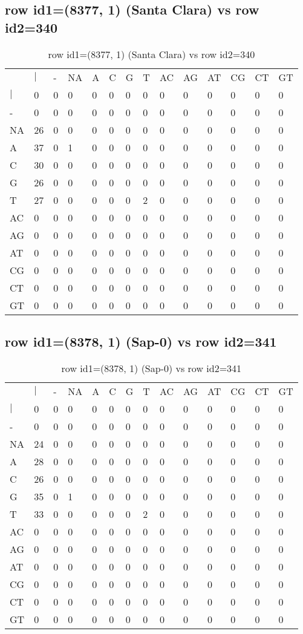 \subsection{row id1=(8377, 1) (Santa Clara) vs row id2=340}
\begin{center}
\begin{longtable}{|l|l|l|l|l|l|l|l|l|l|l|l|l|l|}
\caption{row id1=(8377, 1) (Santa Clara) vs row id2=340} \label{table_dm422}\\
\hline
\\
\hline
&$|$&-&NA&A&C&G&T&AC&AG&AT&CG&CT&GT\\
$|$&0&0&0&0&0&0&0&0&0&0&0&0&0\\
-&0&0&0&0&0&0&0&0&0&0&0&0&0\\
NA&26&0&0&0&0&0&0&0&0&0&0&0&0\\
A&37&0&1&0&0&0&0&0&0&0&0&0&0\\
C&30&0&0&0&0&0&0&0&0&0&0&0&0\\
G&26&0&0&0&0&0&0&0&0&0&0&0&0\\
T&27&0&0&0&0&0&2&0&0&0&0&0&0\\
AC&0&0&0&0&0&0&0&0&0&0&0&0&0\\
AG&0&0&0&0&0&0&0&0&0&0&0&0&0\\
AT&0&0&0&0&0&0&0&0&0&0&0&0&0\\
CG&0&0&0&0&0&0&0&0&0&0&0&0&0\\
CT&0&0&0&0&0&0&0&0&0&0&0&0&0\\
GT&0&0&0&0&0&0&0&0&0&0&0&0&0\\
\hline
\end{longtable}
\end{center}

\subsection{row id1=(8378, 1) (Sap-0) vs row id2=341}
\begin{center}
\begin{longtable}{|l|l|l|l|l|l|l|l|l|l|l|l|l|l|}
\caption{row id1=(8378, 1) (Sap-0) vs row id2=341} \label{table_dm424}\\
\hline
\\
\hline
&$|$&-&NA&A&C&G&T&AC&AG&AT&CG&CT&GT\\
$|$&0&0&0&0&0&0&0&0&0&0&0&0&0\\
-&0&0&0&0&0&0&0&0&0&0&0&0&0\\
NA&24&0&0&0&0&0&0&0&0&0&0&0&0\\
A&28&0&0&0&0&0&0&0&0&0&0&0&0\\
C&26&0&0&0&0&0&0&0&0&0&0&0&0\\
G&35&0&1&0&0&0&0&0&0&0&0&0&0\\
T&33&0&0&0&0&0&2&0&0&0&0&0&0\\
AC&0&0&0&0&0&0&0&0&0&0&0&0&0\\
AG&0&0&0&0&0&0&0&0&0&0&0&0&0\\
AT&0&0&0&0&0&0&0&0&0&0&0&0&0\\
CG&0&0&0&0&0&0&0&0&0&0&0&0&0\\
CT&0&0&0&0&0&0&0&0&0&0&0&0&0\\
GT&0&0&0&0&0&0&0&0&0&0&0&0&0\\
\hline
\end{longtable}
\end{center}

